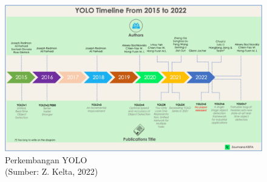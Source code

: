 \begin{figure}[H]
	\vspace{-0.1cm}
	\begin{center}
		\includegraphics[width=0.9\columnwidth]{bab2/Gambar/Picture36.png}
	\end{center}
	\vspace{-0.2cm}
	\captionsetup{justification=centering}
	\caption{Perkembangan YOLO\\(Sumber: Z. Kelta, 2022)}\label{img:Perkembangan-YOLO}
\end{figure}

